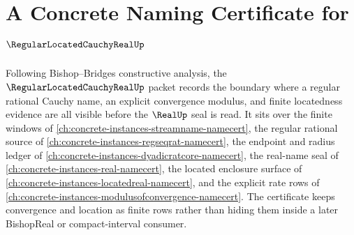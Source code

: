 \chapter{A Concrete Naming Certificate for $\RegularLocatedCauchyRealUp$}
\label{ch:concrete-instances-regular-located-cauchy-real-namecert}

Following Bishop--Bridges constructive analysis, the $\RegularLocatedCauchyRealUp$ packet records the boundary where a regular rational Cauchy name, an explicit convergence modulus, and finite locatedness evidence are all visible before the $\RealUp$ seal is read. It sits over the finite windows of \autoref{ch:concrete-instances-streamname-namecert}, the regular rational source of \autoref{ch:concrete-instances-regseqrat-namecert}, the endpoint and radius ledger of \autoref{ch:concrete-instances-dyadicratcore-namecert}, the real-name seal of \autoref{ch:concrete-instances-real-namecert}, the located enclosure surface of \autoref{ch:concrete-instances-locatedreal-namecert}, and the explicit rate rows of \autoref{ch:concrete-instances-modulusofconvergence-namecert}. The certificate keeps convergence and location as finite rows rather than hiding them inside a later BishopReal or compact-interval consumer.

